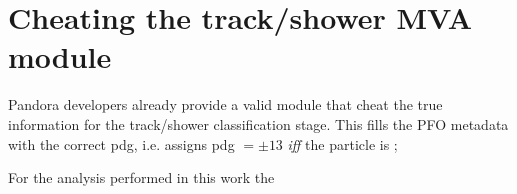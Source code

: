 
\chapter{Cheating the track/shower MVA module}

Pandora developers already provide a valid module that cheat the true information for the track/shower classification stage. This fills the PFO metadata with the correct pdg, i.e. assigns pdg $= \pm 13$ \emph{iff} the particle is \PGmpm; 

For the analysis performed in this work the 


